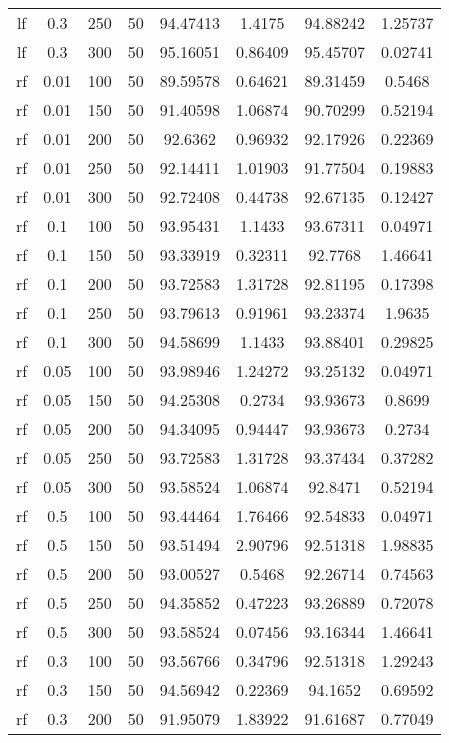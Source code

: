 \begin{table}[htbp]
\begin{tabular}{|c|c|c|c|c|c|c|c|}
lf & 0.3 & 250 & 50 & 94.47413 & 1.4175 & 94.88242 & 1.25737 \\
lf & 0.3 & 300 & 50 & 95.16051 & 0.86409 & 95.45707 & 0.02741 \\
rf & 0.01 & 100 & 50 & 89.59578 & 0.64621 & 89.31459 & 0.5468 \\
rf & 0.01 & 150 & 50 & 91.40598 & 1.06874 & 90.70299 & 0.52194 \\
rf & 0.01 & 200 & 50 & 92.6362 & 0.96932 & 92.17926 & 0.22369 \\
rf & 0.01 & 250 & 50 & 92.14411 & 1.01903 & 91.77504 & 0.19883 \\
rf & 0.01 & 300 & 50 & 92.72408 & 0.44738 & 92.67135 & 0.12427 \\
rf & 0.1 & 100 & 50 & 93.95431 & 1.1433 & 93.67311 & 0.04971 \\
rf & 0.1 & 150 & 50 & 93.33919 & 0.32311 & 92.7768 & 1.46641 \\
rf & 0.1 & 200 & 50 & 93.72583 & 1.31728 & 92.81195 & 0.17398 \\
rf & 0.1 & 250 & 50 & 93.79613 & 0.91961 & 93.23374 & 1.9635 \\
rf & 0.1 & 300 & 50 & 94.58699 & 1.1433 & 93.88401 & 0.29825 \\
rf & 0.05 & 100 & 50 & 93.98946 & 1.24272 & 93.25132 & 0.04971 \\
rf & 0.05 & 150 & 50 & 94.25308 & 0.2734 & 93.93673 & 0.8699 \\
rf & 0.05 & 200 & 50 & 94.34095 & 0.94447 & 93.93673 & 0.2734 \\
rf & 0.05 & 250 & 50 & 93.72583 & 1.31728 & 93.37434 & 0.37282 \\
rf & 0.05 & 300 & 50 & 93.58524 & 1.06874 & 92.8471 & 0.52194 \\
rf & 0.5 & 100 & 50 & 93.44464 & 1.76466 & 92.54833 & 0.04971 \\
rf & 0.5 & 150 & 50 & 93.51494 & 2.90796 & 92.51318 & 1.98835 \\
rf & 0.5 & 200 & 50 & 93.00527 & 0.5468 & 92.26714 & 0.74563 \\
rf & 0.5 & 250 & 50 & 94.35852 & 0.47223 & 93.26889 & 0.72078 \\
rf & 0.5 & 300 & 50 & 93.58524 & 0.07456 & 93.16344 & 1.46641 \\
rf & 0.3 & 100 & 50 & 93.56766 & 0.34796 & 92.51318 & 1.29243 \\
rf & 0.3 & 150 & 50 & 94.56942 & 0.22369 & 94.1652 & 0.69592 \\
rf & 0.3 & 200 & 50 & 91.95079 & 1.83922 & 91.61687 & 0.77049 \\

\end{tabular}
\end{table}
